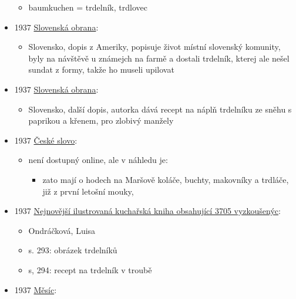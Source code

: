 \begin{itemize}
  \begin{itemize}
  \tightlist
  \item
    baumkuchen = trdelník, trdlovec
  \end{itemize}
\item
  1937
  \href{http://digitalna.kniznica.info/zoom/90599/view?search=trdeln\%C3\%ADk\%20OR\%20trdeln\%C3\%ADka\%20OR\%20trdeln\%C3\%ADku&page=6&p=separate&tool=search&view=1502,2130,4778,2339}{Slovenská
  obrana}:

  \begin{itemize}
  \tightlist
  \item
    Slovensko, dopis z Ameriky, popisuje život místní slovenský
    komunity, byly na návštěvě u známejch na farmě a dostali trdelník,
    kterej ale nešel sundat z formy, takže ho museli upilovat
  \end{itemize}
\item
  1937
  \href{http://digitalna.kniznica.info/zoom/90688/view?search=trdeln\%C3\%ADk\%20OR\%20trdeln\%C3\%ADka\%20OR\%20trdeln\%C3\%ADku&page=6&p=separate&tool=search&view=2631,1599,4628,2266}{Slovenská
  obrana}:

  \begin{itemize}
  \tightlist
  \item
    Slovensko, další dopis, autorka dává recept na náplň trdelníku ze
    sněhu s paprikou a křenem, pro zlobivý manžely
  \end{itemize}
\item
  1937
  \href{https://ceskadigitalniknihovna.cz/uuid/uuid:b42af96b-ef00-4cc8-ac42-7413f52b7595}{České
  slovo}:

  \begin{itemize}
  \tightlist
  \item
    není dostupný online, ale v náhledu je:

    \begin{itemize}
    \tightlist
    \item
      zato mají o hodech na Maršově koláče, buchty, makovníky a trdláče,
      již z první letošní mouky,
    \end{itemize}
  \end{itemize}
\item
  1937
  \href{https://ceskadigitalniknihovna.cz/uuid/uuid:6f308ed0-4eaf-11ed-8756-005056827e51}{Nejnovější
  ilustrovaná kuchařská kniha obsahující 3705 vyzkoušenýc}:

  \begin{itemize}
  \tightlist
  \item
    Ondráčková, Luisa
  \item
    s. 293: obrázek trdelníků
  \item
    s, 294: recept na trdelník v troubě
  \end{itemize}
\item
  1937
  \href{https://ceskadigitalniknihovna.cz/uuid/uuid:0e56bea0-5587-11e5-81eb-001018b5eb5c}{Měsíc}:


\end{itemize}
